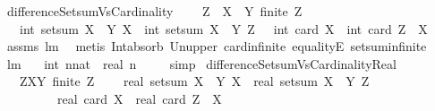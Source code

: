 \begin{isabellebody}
\ differenceSetsumVsCardinality{\isacharcolon}\ \isanewline
\ \ \ {\isachardoublequoteopen}Z\ {\isasymsubseteq}\ X\ {\isasymunion}\ Y{\isachardoublequoteclose}\ {\isachardoublequoteopen}finite\ Z{\isachardoublequoteclose}\ \isanewline
\ \ \ {\isachardoublequoteopen}int\ {\isacharparenleft}setsum\ {\isacharparenleft}X\ {\isacharless}{\isacharbar}\ Y{\isacharparenright}\ X{\isacharparenright}\ {\isacharminus}\ int\ {\isacharparenleft}setsum\ {\isacharparenleft}X\ {\isacharless}{\isacharbar}\ Y{\isacharparenright}\ Z{\isacharparenright}\ {\isacharequal}\ \ int\ {\isacharparenleft}card\ X{\isacharparenright}\ {\isacharminus}\ int\ {\isacharparenleft}card\ {\isacharparenleft}Z\ {\isasyminter}\ X{\isacharparenright}{\isacharparenright}{\isachardoublequoteclose}\ \isanewline
%
\isadelimproof
\ \ %
\endisadelimproof
%
\isatagproof
{}\isamarkupfalse%
\ assms\ lm{}{}{}\ \isamarkupfalse%
\ {\isacharparenleft}metis\ Int{\isacharunderscore}absorb{}\ Un{\isacharunderscore}upper{}\ card{\isacharunderscore}infinite\ equalityE\ setsum{\isachardot}infinite{\isacharparenright}%
\endisatagproof
{\isafoldproof}%
%
\isadelimproof
\isanewline
%
\endisadelimproof
\isanewline
\isanewline
{}\isamarkupfalse%
\ lm{}{}{}{\isacharcolon}\ \isanewline
\ \ {\isachardoublequoteopen}int\ {\isacharparenleft}n{\isacharcolon}{\isacharcolon}nat{\isacharparenright}\ {\isacharequal}\ real\ n{\isachardoublequoteclose}\ \isanewline
%
\isadelimproof
\ \ %
\endisadelimproof
%
\isatagproof
{}\isamarkupfalse%
\ simp%
\endisatagproof
{\isafoldproof}%
%
\isadelimproof
\isanewline
%
\endisadelimproof
\isanewline
\isanewline
{}\isamarkupfalse%
\ differenceSetsumVsCardinalityReal{\isacharcolon}\ \isanewline
\ \ \ {\isachardoublequoteopen}Z{\isasymsubseteq}X{\isasymunion}Y{\isachardoublequoteclose}\ {\isachardoublequoteopen}finite\ Z{\isachardoublequoteclose}\ \isanewline
\ \ \ {\isachardoublequoteopen}real\ {\isacharparenleft}setsum\ {\isacharparenleft}X\ {\isacharless}{\isacharbar}\ Y{\isacharparenright}\ X{\isacharparenright}\ {\isacharminus}\ real\ {\isacharparenleft}setsum\ {\isacharparenleft}X\ {\isacharless}{\isacharbar}\ Y{\isacharparenright}\ Z{\isacharparenright}\ {\isacharequal}\ \isanewline
\ \ \ \ \ \ \ \ \ real\ {\isacharparenleft}card\ X{\isacharparenright}\ {\isacharminus}\ real\ {\isacharparenleft}card\ {\isacharparenleft}Z\ {\isasyminter}\ X{\isacharparenright}{\isacharparenright}{\isachardoublequoteclose}\ \isanewline

\end{isabellebody}
